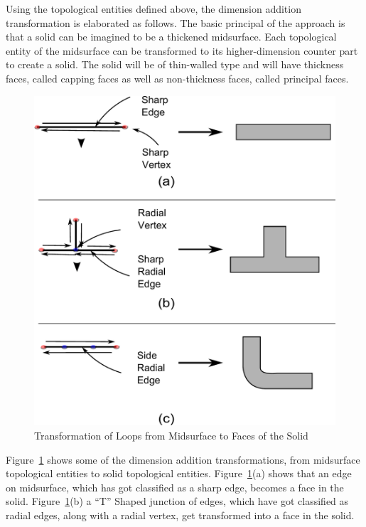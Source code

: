 

	
Using the topological entities defined above, the dimension addition transformation is elaborated as follows.
%	
The basic principal of the approach is that a solid can be imagined to be a thickened midsurface. Each topological entity of the midsurface can be transformed to its higher-dimension counter part to create a solid. The solid will be of thin-walled type and will have thickness faces, called capping faces as well as non-thickness faces, called principal faces.



	\begin{figure}[!h]
	\centering     %
	\includegraphics[width=0.62\linewidth]{images/NonManifoldLoopsToFaces2.pdf}
	\caption{Transformation of Loops from Midsurface to Faces of the Solid}
	\label{fig:topoval:loopstofaces}
	\end{figure}

	
Figure~\ref{fig:topoval:loopstofaces} shows some of the dimension addition transformations, from midsurface topological entities to solid topological entities. Figure~\ref{fig:topoval:loopstofaces}(a) shows that an edge on midsurface, which has got classified as a sharp edge, becomes a face in the solid.  Figure~\ref{fig:topoval:loopstofaces}(b) a ``T'' Shaped junction of edges, which have got classified as radial edges, along with a radial vertex, get transformed into a face in the solid.

